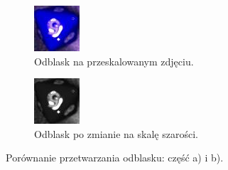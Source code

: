 \begin{figure}[H]
    \centering
    \begin{subfigure}[t]{0.45\linewidth}
        \centering
        \includegraphics[width=\linewidth]{chapters/04-czytanie/figures/blask_raw}
        \caption{Odblask na przeskalowanym zdjęciu.}
        \label{fig:blaskraw}
    \end{subfigure}
    \hfill
    \begin{subfigure}[t]{0.45\linewidth}
        \centering
        \includegraphics[width=\linewidth]{chapters/04-czytanie/figures/blask_proc}
        \caption{Odblask po zmianie na skalę szarości.}
        \label{fig:blaskproc}
    \end{subfigure}
    \caption{Porównanie przetwarzania odblasku: część a) i b).}
    \label{fig:blaskcombined}
\end{figure}


